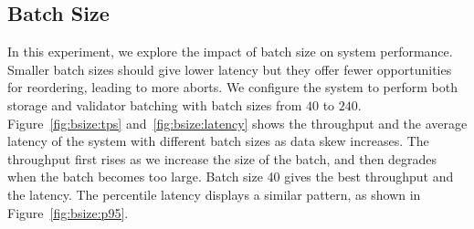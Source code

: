 \subsection{Batch Size}
In this experiment, we explore the impact of batch size on system performance. 
Smaller batch sizes should give lower latency but they offer fewer opportunities for reordering, leading to more aborts. 
We configure the system to perform both storage and validator batching with batch sizes from $40$ to $240$.
Figure~\ref{fig:bsize:tps} and~\ref{fig:bsize:latency} shows the throughput and the average latency of the system with different batch sizes as data skew increases. The throughput first rises as we increase the size of the batch, and then degrades when the batch becomes too large. Batch size 40 gives the best throughput and the latency. The percentile latency displays a similar pattern, as shown in Figure~\ref{fig:bsize:p95}. 
